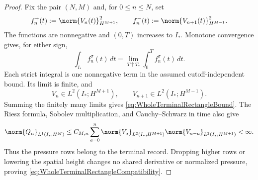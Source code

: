 
\begin{proof}
Fix the pair \((N,M)\) and, for \(0\leq n\leq N\), set
\[
  f_n^+(t):=\norm{V_n(t)}_{H^{M+1}}^2,
  \qquad
  f_n^-(t):=\norm{V_{n+1}(t)}_{H^{M-1}}^2.
\]
The functions are nonnegative and \((0,T)\) increases to \(I_*\).  Monotone
convergence gives, for either sign,
\[
  \int_{I_*}f_n^\sigma(t)\,dt
  =
  \lim_{T\uparrow T_*}\int_0^T f_n^\sigma(t)\,dt.
\]
Each strict integral is one nonnegative term in the assumed cutoff-independent
bound.  Its limit is finite, and
\[
  V_n\in L^2(I_*;H^{M+1}),
  \qquad
  V_{n+1}\in L^2(I_*;H^{M-1}).
\]
Summing the finitely many limits gives
\eqref{eq:WholeTerminalRectangleBound}.  The Riesz formula, Sobolev
multiplication, and Cauchy--Schwarz in time also give
\[
  \norm{Q_n}_{L^1(I_*;H^M)}
  \leq
  C_{M,n}\sum_{a=0}^{n}
  \norm{V_a}_{L^2(I_*;H^{M+1})}
  \norm{V_{n-a}}_{L^2(I_*;H^{M+1})}
  <\infty.
\]
Thus the pressure rows belong to the terminal record.  Dropping higher rows or
lowering the spatial height changes no shared derivative or normalized
pressure, proving \eqref{eq:WholeTerminalRectangleCompatibility}.
\end{proof}

